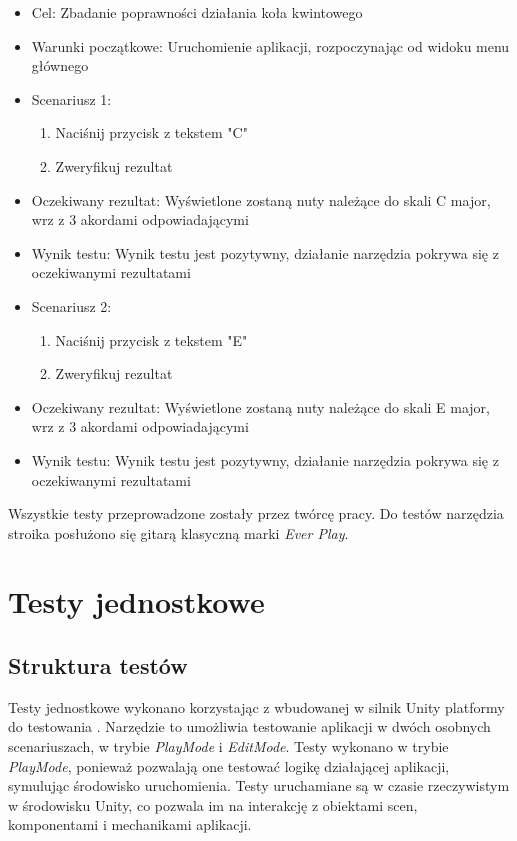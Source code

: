 \begin{itemize}
    \item Cel: Zbadanie poprawności działania koła kwintowego
    \item Warunki początkowe: Uruchomienie aplikacji, rozpoczynając od widoku menu głównego
    \item Scenariusz 1:
        \begin{enumerate}
            \item Naciśnij przycisk z tekstem "C"
            \item Zweryfikuj rezultat
        \end{enumerate}
    \item Oczekiwany rezultat: Wyświetlone zostaną nuty należące do skali C major, wrz z 3 akordami odpowiadającymi 
    \item Wynik testu: Wynik testu jest pozytywny, działanie narzędzia pokrywa się z oczekiwanymi rezultatami
    \item Scenariusz 2:
        \begin{enumerate}
            \item Naciśnij przycisk z tekstem "E"
            \item Zweryfikuj rezultat
        \end{enumerate}
    \item Oczekiwany rezultat: Wyświetlone zostaną nuty należące do skali E major, wrz z 3 akordami odpowiadającymi 
    \item Wynik testu: Wynik testu jest pozytywny, działanie narzędzia pokrywa się z oczekiwanymi rezultatami
\end{itemize}

Wszystkie testy przeprowadzone zostały przez twórcę pracy. Do testów narzędzia stroika posłużono się gitarą klasyczną marki \emph{Ever Play}.

\section{Testy jednostkowe}

\subsection{Struktura testów}

Testy jednostkowe wykonano korzystając z wbudowanej w silnik Unity platformy do testowania \cite{UnityTestFramework}. Narzędzie to umożliwia testowanie aplikacji w dwóch osobnych scenariuszach, w trybie \emph{PlayMode} i \emph{EditMode}. Testy wykonano w trybie \emph{PlayMode}, ponieważ pozwalają one testować logikę działającej aplikacji, symulując środowisko uruchomienia. Testy uruchamiane są w czasie rzeczywistym w środowisku Unity, co pozwala im na interakcję z obiektami scen, komponentami i mechanikami aplikacji.

